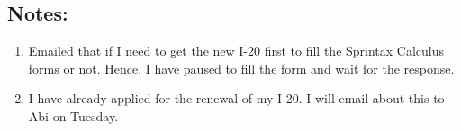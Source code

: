 \subsection*{Notes:}
\begin{enumerate}
    \item Emailed that if I need to get the new I-20 first to fill the Sprintax Calculus forms or not. Hence, I have paused to fill the form and wait for the response.
    \item I have already applied for the renewal of my I-20. I will email about this to Abi on Tuesday.    
\end{enumerate}
\starredline